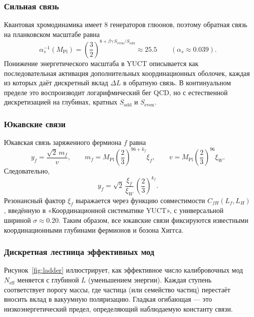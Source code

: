 \documentclass[12pt,a4paper]{article}
\begin{document}
	\subsubsection{Сильная связь}
	Квантовая хромодинамика имеет 8 генераторов глюонов, поэтому обратная связь на планковском масштабе равна
	\begin{equation}
		\alpha_s^{-1}(M_{\mathrm{Pl}}) = \left(\frac{3}{2}\right)^{\!8 + \beta\gamma\,S_{\mathrm{even}}/S_{\mathrm{odd}}}
		\approx 25.5 \qquad (\alpha_s \approx 0.039) .
	\end{equation}
	Понижение энергетического масштаба в YUCT описывается как последовательная активация дополнительных координационных оболочек, каждая из которых даёт дискретный вклад \(\Delta L\) в обратную связь. В континуальном пределе это воспроизводит логарифмический бег QCD, но с естественной дискретизацией на глубинах, кратных \(S_{\mathrm{odd}}\) и \(S_{\mathrm{even}}\).
	
	\subsubsection{Юкавские связи}
	Юкавская связь заряженного фермиона \(f\) равна
	\begin{equation}
		y_f = \frac{\sqrt{2}\,m_f}{v},
		\qquad
		m_f = M_{\mathrm{Pl}}\left(\frac{2}{3}\right)^{\!96+k_f}\xi_f,
		\qquad
		v   = M_{\mathrm{Pl}}\left(\frac{2}{3}\right)^{\!96}\xi_W .
	\end{equation}
	Следовательно,
	\begin{equation}
		y_f = \sqrt{2}\,\frac{\xi_f}{\xi_W}\,\left(\frac{2}{3}\right)^{\!k_f} .
	\end{equation}
	Резонансный фактор \(\xi_f\) выражается через функцию совместимости \(C_{fH}(L_f,L_H)\), введённую в «Координационной систематике YUCT», с универсальной шириной \(\sigma \approx 0.20\). Таким образом, все юкавские связи фиксируются известными координационными глубинами фермионов и бозона Хиггса.
	
	\subsubsection{Дискретная лестница эффективных мод}
	Рисунок~\ref{fig:ladder} иллюстрирует, как эффективное число калибровочных мод \(N_{\mathrm{eff}}\) меняется с глубиной \(L\) (уменьшением энергии). Каждая ступень соответствует порогу массы, где частица (или семейство частиц) перестаёт вносить вклад в вакуумную поляризацию. Гладкая огибающая — это низкоэнергетический предел, определяющий наблюдаемую константу связи.
	
\end{document}
